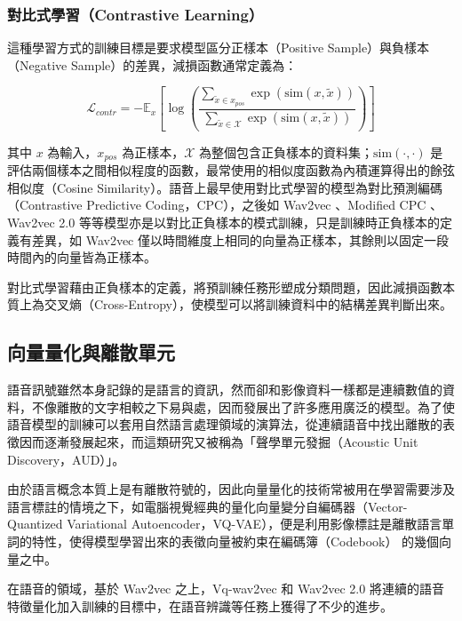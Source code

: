 \subsubsection{對比式學習（Contrastive Learning）}

這種學習方式的訓練目標是要求模型區分正樣本（Positive Sample）與負樣本（Negative Sample）的差異，減損函數通常定義為：

$$\mathcal{L}_{contr} = -\mathbb{E}_x\left[\log
\left(
{\frac
{\sum_{\tilde{x} \in x_{pos}}\exp(\text{sim}(x, \tilde{x}))}
{\sum_{\tilde{x} \in \mathcal{X}}\exp(\text{sim}(x, \tilde{x}))}
}\right)\right]$$

其中 $x$ 為輸入，$x_{pos}$ 為正樣本，$\mathcal{X}$ 為整個包含正負樣本的資料集；$\text{sim}(\cdot, \cdot)$ 是評估兩個樣本之間相似程度的函數，最常使用的相似度函數為內積運算得出的餘弦相似度（Cosine Similarity）。語音上最早使用對比式學習的模型為對比預測編碼（Contrastive Predictive Coding，CPC）\cite{maekaku2022speech}，之後如 Wav2vec \cite{schneider2019wav2vec}、Modified CPC \cite{rivière2020unsupervised}、Wav2vec 2.0 \cite{baevski2020wav2vec} 等等模型亦是以對比正負樣本的模式訓練，只是訓練時正負樣本的定義有差異，如 Wav2vec 僅以時間維度上相同的向量為正樣本，其餘則以固定一段時間內的向量皆為正樣本。

對比式學習藉由正負樣本的定義，將預訓練任務形塑成分類問題，因此減損函數本質上為交叉熵（Cross-Entropy），使模型可以將訓練資料中的結構差異判斷出來。

\subsection{向量量化與離散單元}

語音訊號雖然本身記錄的是語言的資訊，然而卻和影像資料一樣都是連續數值的資料，不像離散的文字相較之下易與處，因而發展出了許多應用廣泛的模型。為了使語音模型的訓練可以套用自然語言處理領域的演算法，從連續語音中找出離散的表徵因而逐漸發展起來，而這類研究又被稱為「聲學單元發掘（Acoustic Unit Discovery，AUD）」。

由於語言概念本質上是有離散符號的，因此向量量化的技術常被用在學習需要涉及語言標註的情境之下，如電腦視覺經典的量化向量變分自編碼器（Vector-Quantized Variational Autoencoder，VQ-VAE）\cite{van2017neural}，便是利用影像標註是離散語言單詞的特性，使得模型學習出來的表徵向量被約束在編碼簿（Codebook） 的幾個向量之中。

在語音的領域，基於 Wav2vec 之上，Vq-wav2vec \cite{baevski2019vq} 和 Wav2vec 2.0 將連續的語音特徵量化加入訓練的目標中，在語音辨識等任務上獲得了不少的進步。


